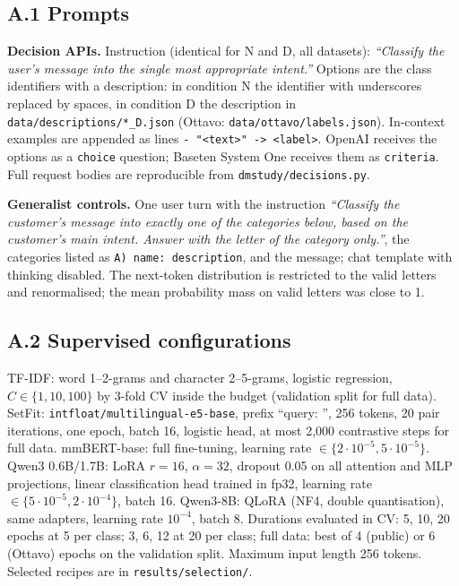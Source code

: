 \subsection*{A.1 Prompts}
\textbf{Decision APIs.} Instruction (identical for N and D, all datasets): \emph{``Classify the user's message into the single most
appropriate intent.''} Options are the class identifiers with a description: in condition N the identifier with underscores replaced
by spaces, in condition D the description in \nolinkurl{data/descriptions/*_D.json} (Ottavo: \nolinkurl{data/ottavo/labels.json}).
In-context examples are appended as lines \texttt{- "<text>" -> <label>}. OpenAI receives the options as a \texttt{choice} question;
Baseten System One receives them as \texttt{criteria}. Full request bodies are reproducible from \nolinkurl{dmstudy/decisions.py}.

\textbf{Generalist controls.} One user turn with the instruction \emph{``Classify the customer's message into exactly one of the categories
below, based on the customer's main intent. Answer with the letter of the category only.''}, the categories listed as
\texttt{A) name: description}, and the message; chat template with thinking disabled. The next-token distribution is restricted to
the valid letters and renormalised; the mean probability mass on valid letters was close to 1.

\subsection*{A.2 Supervised configurations}
TF-IDF: word 1--2-grams and character 2--5-grams, logistic regression, $C\in\{1,10,100\}$ by 3-fold CV inside the budget (validation
split for full data). SetFit: \nolinkurl{intfloat/multilingual-e5-base}, prefix ``query: '', 256 tokens, 20 pair iterations, one epoch,
batch 16, logistic head, at most 2{,}000 contrastive steps for full data. mmBERT-base: full fine-tuning, learning rate $\in\{2\cdot10^{-5},
5\cdot10^{-5}\}$. Qwen3 0.6B/1.7B: LoRA $r=16$, $\alpha=32$, dropout 0.05 on all attention and MLP projections, linear classification head
trained in fp32, learning rate $\in\{5\cdot10^{-5}, 2\cdot10^{-4}\}$, batch 16. Qwen3-8B: QLoRA (NF4, double quantisation), same adapters,
learning rate $10^{-4}$, batch 8. Durations evaluated in CV: 5, 10, 20 epochs at 5 per class; 3, 6, 12 at 20 per class; full data: best of
4 (public) or 6 (Ottavo) epochs on the validation split. Maximum input length 256 tokens. Selected recipes are in \nolinkurl{results/selection/}.

